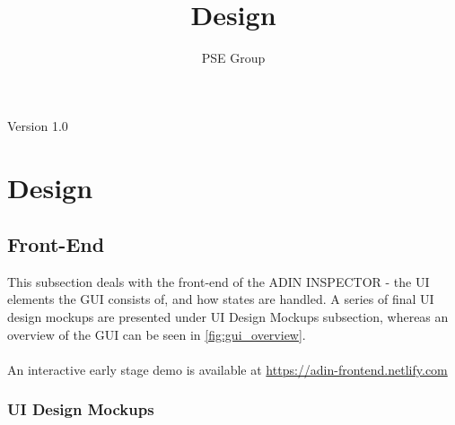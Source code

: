 \documentclass[oneside, english, final]{design}
\author{PSE Group}
\title{
Design}
\begin{document}
\nocite{*}

\setpdf

\maketitle


\hfill

\begin{center}
	\large{Version 1.0}
\end{center}


\thispagestyle{empty}
\begin{abstract}
	\thispagestyle{empty}
\end{abstract}

\thispagestyle{empty}
\newpage
\thispagestyle{empty}
\tableofcontents
\cleardoublepage
\setcounter{page}{1}


\section{Design}\label{sec:intro}
\subsection{Front-End}
This subsection deals with the front-end of the ADIN INSPECTOR - the UI elements the GUI consists of, and how states are handled. A series of final UI design mockups are presented under UI Design Mockups subsection, whereas an overview of the GUI can be seen in \autoref{fig:gui_overview}.\\
\\
An interactive early stage demo is available at \url{https://adin-frontend.netlify.com}

\subsubsection{UI Design Mockups}
\end{document}
